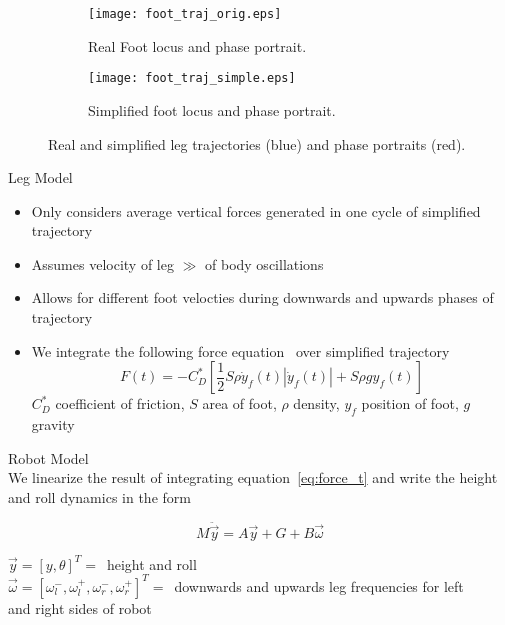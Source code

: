 \begin{figure}[tb]
\centering
\begin{subfigure}[t]{0.47\textwidth}
    \centering
    \texttt{[image: foot\_traj\_orig.eps]}
    \caption{Real Foot locus and phase portrait.}%
    \label{fig:trajrob}
\end{subfigure}
\quad
\begin{subfigure}[t]{0.47\textwidth}
    \centering
    \texttt{[image: foot\_traj\_simple.eps]}
    \caption{Simplified foot locus and phase portrait.} 
    \label{fig:trajsimp}
\end{subfigure}
\vspace{0.5EX}
\caption{Real and simplified leg trajectories (blue) and phase portraits (red).}
\label{fig:traj}
\end{figure}
\vspace{2EX}

\textcolor{prime}{\textsf{Leg Model}}
\begin{itemize}
    \item Only considers average vertical forces generated in one cycle of simplified trajectory
    \item Assumes velocity of leg $\gg$ of body oscillations
    \item Allows for different foot velocties during downwards and upwards phases of trajectory
    \item We integrate the following force equation~\cite{glasheen1996vertical} over simplified trajectory
        \begin{equation}
            F(t) = - C_D^* \left[\frac{1}{2} S \rho \dot{y}_f(t) |\dot{y}_f(t) | + S \rho g y_f(t) \right]
            \label{eq:force_t}
        \end{equation}
\hspace{1EM} \small{$C_D^*$ coefficient of friction, $S$ area of foot, $\rho$ density, $y_f$ position of foot, $g$ gravity}
\end{itemize}
\vspace{1EX}

\textcolor{prime}{\textsf{Robot Model}} \\
We linearize the result of integrating equation~\ref{eq:force_t} and write the height and roll dynamics in the form

\begin{equation}
    M \ddot{\vec{y}} = A \vec{y} + G + B \vec{\omega} 
    \label{eq:rob_dyn}
\end{equation}

\hspace{1EM} $\vec{y} = [y, \theta]^T = $\  height and roll \\

\hspace{1EM} $\vec{\omega} = [\omega^-_l, \omega^+_l, \omega^-_r, \omega^+_r]^T = $\ downwards and upwards leg frequencies for left \\ \hspace{1EM} and right sides of robot
